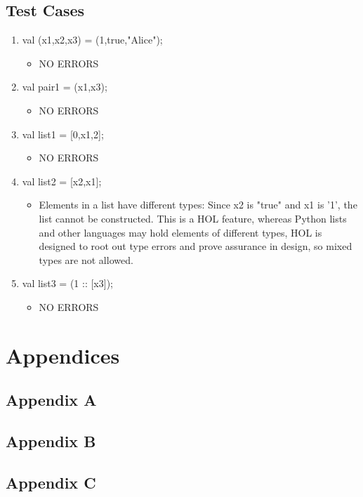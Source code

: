 \documentclass[oneside]{book}
\begin{document}
\section{Test Cases}
\begin{enumerate}
    \item val (x1,x2,x3) = (1,true,"Alice");
    \begin{itemize}
        \item NO ERRORS
    \end{itemize}
    \item val pair1 = (x1,x3);
    \begin{itemize}
        \item NO ERRORS
    \end{itemize}
    \item val list1 = [0,x1,2];
    \begin{itemize}
        \item NO ERRORS
    \end{itemize}
    \item val list2 = [x2,x1];
    \begin{itemize}
        \item Elements in a list have different types: Since x2 is "true" and x1 is '1', the list cannot be constructed. This is a HOL feature, whereas Python lists and other languages may hold elements of different types, HOL is designed to root out type errors and prove assurance in design, so mixed types are not allowed.
    \end{itemize}
    \item val list3 = (1 :: [x3]);
    \begin{itemize}
        \item NO ERRORS
    \end{itemize}
\end{enumerate}

\chapter{Appendices}
\appendix
\section{Appendix A}



\section{Appendix B}



\section{Appendix C}


\end{document}
